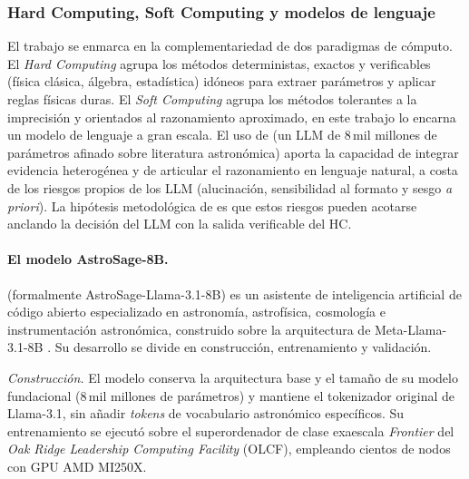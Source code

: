 \subsubsection{Hard Computing, Soft Computing y modelos de lenguaje}
\label{sec:metodo-paradigmas}

El trabajo se enmarca en la complementariedad de dos paradigmas de cómputo. El
\emph{Hard Computing} agrupa los métodos deterministas, exactos y verificables
(física clásica, álgebra, estadística) idóneos para extraer parámetros y
aplicar reglas físicas duras. El \emph{Soft Computing} agrupa los métodos
tolerantes a la imprecisión y orientados al razonamiento aproximado, en este
trabajo lo encarna un modelo de lenguaje a gran escala. El uso de \AstroSage{}
(un LLM de \num{8}\,mil millones de parámetros afinado sobre literatura
astronómica) aporta la capacidad de integrar evidencia heterogénea y de
articular el razonamiento en lenguaje natural, a costa de los riesgos propios de
los LLM (alucinación, sensibilidad al formato y sesgo \emph{a priori}). La
hipótesis metodológica de \STELLAR{} es que estos riesgos pueden acotarse
anclando la decisión del LLM con la salida verificable del HC.

\paragraph{El modelo AstroSage-8B.} \AstroSage{} (formalmente
AstroSage-Llama-3.1-8B) es un asistente de inteligencia artificial de código
abierto especializado en astronomía, astrofísica, cosmología e instrumentación
astronómica, construido sobre la arquitectura de Meta-Llama-3.1-8B
\citep{astrosage}. Su desarrollo se divide en construcción, entrenamiento y
validación.

\emph{Construcción.} El modelo conserva la arquitectura base y el tamaño de su
modelo fundacional (\num{8}\,mil millones de parámetros) y mantiene el
tokenizador original de Llama-3.1, sin añadir \emph{tokens} de vocabulario
astronómico específicos. Su entrenamiento se ejecutó sobre el superordenador de
clase exaescala \emph{Frontier} del \emph{Oak Ridge Leadership Computing
Facility} (OLCF), empleando cientos de nodos con GPU AMD MI250X.


